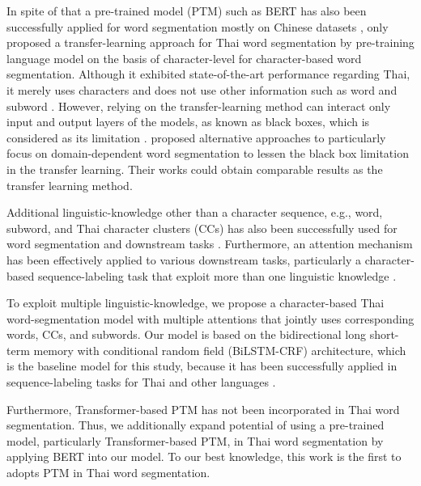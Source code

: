 In spite of that a pre-trained model (PTM) such as BERT \cite{devlin-etal-2019-bert} has also been successfully applied for word segmentation mostly on Chinese datasets \cite{yang-etal-2019-bert,qiu-etal-2020-concise,ke-etal-2020-unified,huang-etal-2020-towards,ke-etal-2021-pre}, only  proposed a transfer-learning approach for Thai word segmentation by pre-training language model on the basis of character-level for character-based word segmentation. 
%
Although it exhibited state-of-the-art performance regarding Thai, it merely uses characters and does not use other information such as word and subword \cite{sennrich-etal-2016-neural,kudo-2018-subword}.
%
However, relying on the transfer-learning method can interact only input and output layers of the models, as known as black boxes, which is considered as its limitation \cite{limkonchotiwat-etal-2020-domain}. 
%
 proposed alternative approaches to particularly focus on domain-dependent word segmentation to lessen the black box limitation in the transfer learning.
%
Their works could obtain comparable results as the transfer learning method.
%

Additional linguistic-knowledge other than a character sequence, e.g., word, subword, and Thai character clusters (CCs) \cite{Theeramunkong2000} has also been successfully used for word segmentation and downstream tasks \cite{Sutantayawalee2015,Lapjaturapit2018,Nararatwong2018,yang-etal-2019-subword,li-etal-2019-word-segmentation}.
%
Furthermore, an attention mechanism \cite{Bahdanau2015} has been effectively applied to various downstream tasks, particularly a character-based sequence-labeling task that exploit more than one linguistic knowledge \cite{higashiyama-etal-2019-incorporating,tian-etal-2020-joint}.
%

To exploit multiple linguistic-knowledge, we propose a character-based Thai word-segmentation model with multiple attentions that jointly uses corresponding words, CCs, and subwords.
%
Our model is based on the bidirectional long short-term memory with conditional random field (BiLSTM-CRF) architecture, which is the baseline model for this study, because it has been successfully applied in sequence-labeling tasks for Thai and other languages \cite{Jousimo2017,Nararatwong2018,higashiyama-etal-2019-incorporating,seeha-etal-2020-thailmcut,tian-etal-2020-joint}.

%
Furthermore, Transformer-based PTM has not been incorporated in Thai word segmentation.
%
Thus, we additionally expand potential of using a pre-trained model, particularly Transformer-based PTM, in Thai word segmentation by applying BERT into our model.
%
To our best knowledge, this work is the first to adopts PTM in Thai word segmentation. 

